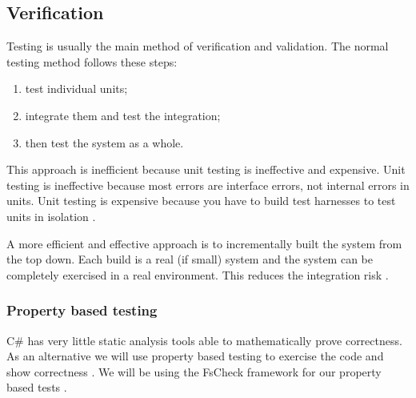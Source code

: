 \subsection{Verification}
Testing is usually the main method of verification and validation. The normal testing
method follows these steps:
\begin{enumerate}
	\item test individual units; 
	\item integrate them and test the integration; 
	\item then test the system as a whole. 
\end{enumerate}
This approach is inefficient because unit testing is ineffective and expensive. 
Unit testing is ineffective because most errors are interface errors, not internal
errors in units. Unit testing is expensive because you have to build test 
harnesses to test units in isolation \parencite{CbyCPraxis}.

A more efficient and effective approach is to incrementally built the system from
the top down. Each build is a real (if small) system and the system can be completely 
exercised in a real environment. This reduces the integration risk \parencite{CbyCPraxis}.

\subsubsection{Property based testing}
C\# has very little static analysis tools able to mathematically prove correctness.
As an alternative we will use property based testing to exercise the code and show 
correctness \parencite{QuickCheck} \parencite{Hamlet94randomtesting}. We will be
using the FsCheck framework for our property based tests \parencite{FsCheck_home}.